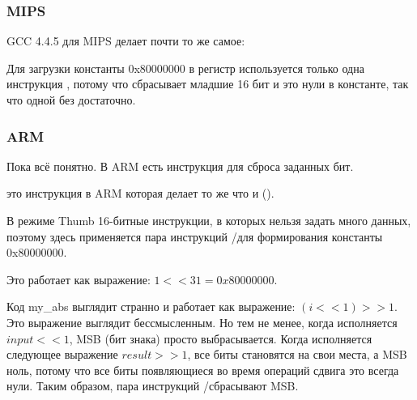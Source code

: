 \subsubsection{MIPS}

GCC 4.4.5 для MIPS делает почти то же самое:



Для загрузки константы 0x80000000 в регистр используется только одна инструкция \LUI, потому что \LUI сбрасывает
младшие 16 бит и это нули в константе, так что одной \LUI без \ORI достаточно.

\subsubsection{ARM}

\myparagraph{\OptimizingKeilVI (\ARMMode)}



Пока всё понятно.
В ARM есть инструкция \BIC для сброса заданных бит.

\EOR это инструкция в ARM которая делает то же что и \XOR ().

\myparagraph{\OptimizingKeilVI (\ThumbMode)}



В режиме Thumb 16-битные инструкции, в которых нельзя задать много данных, поэтому здесь
применяется пара инструкций \MOVS/\LSLS для формирования константы 0x80000000.

Это работает как выражение: $1<<31 = 0x80000000$.

Код my\_abs выглядит странно и работает как выражение: $(i<<1)>>1$.
Это выражение выглядит бессмысленным.
Но тем не менее, когда исполняется $input<<1$, \ac{MSB} (бит знака) просто выбрасывается.
Когда исполняется следующее выражение $result>>1$, все биты становятся на свои места,
а \ac{MSB} ноль, потому что все  биты появляющиеся во время операций сдвига это всегда нули.
Таким образом, пара инструкций \LSLS/\LSRS сбрасывают \ac{MSB}.


